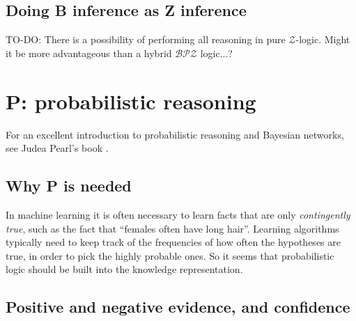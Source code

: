 

\subsection{Doing B inference as Z inference}

TO-DO:  There is a possibility of performing all reasoning in pure $\mathcal{Z}$-logic.  Might it be more advantageous than a hybrid $\mathcal{BPZ}$ logic...?


\section{P: probabilistic reasoning}

For an excellent introduction to probabilistic reasoning and Bayesian networks, see Judea Pearl's book \citep*{Pearl1988}.

\subsection{Why P is needed}
\label{sec:whyP}

In machine learning it is often necessary to learn facts that are only \textit{contingently true}, such as the fact that ``females often have long hair''.  Learning algorithms typically need to keep track of the frequencies of how often the hypotheses are true, in order to pick the highly probable ones.  So it seems that probabilistic logic should be built into the knowledge representation.

\subsection{Positive and negative evidence, and confidence}
\label{sec:NARSconfidence}

